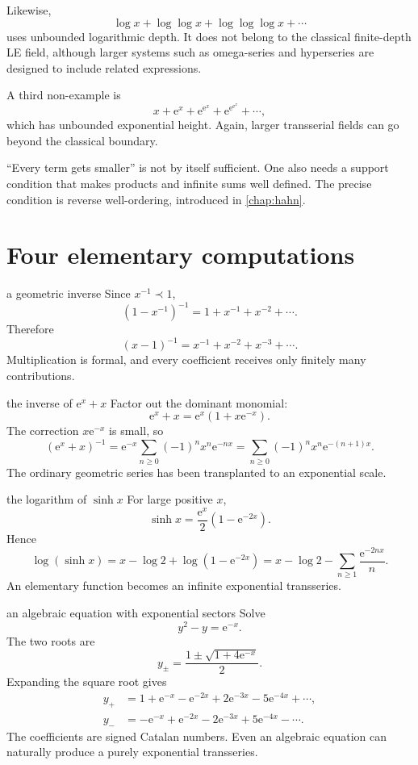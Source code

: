 \documentclass[11pt,openany]{book}
\theoremstyle{plain}
\theoremstyle{definition}
\theoremstyle{remark}
\newcommand{\e}{\mathrm{e}}
\begin{document}
Likewise,
\[
  \log x+\log\log x+\log\log\log x+\cdots
\]
uses unbounded logarithmic depth. It does not belong to the classical finite-depth LE field, although larger systems such as omega-series and hyperseries are designed to include related expressions.

A third non-example is
\[
  x+\e^x+\e^{\e^x}+\e^{\e^{\e^x}}+\cdots,
\]
which has unbounded exponential height. Again, larger transserial fields can go beyond the classical boundary.

\begin{warningbox}
``Every term gets smaller'' is not by itself sufficient. One also needs a support condition that makes products and infinite sums well defined. The precise condition is reverse well-ordering, introduced in \cref{chap:hahn}.
\end{warningbox}

\section{Four elementary computations}

\begin{workedbox}{a geometric inverse}
Since $x^{-1}\prec1$,
\[
  (1-x^{-1})^{-1}=1+x^{-1}+x^{-2}+\cdots.
\]
Therefore
\[
  (x-1)^{-1}=x^{-1}+x^{-2}+x^{-3}+\cdots.
\]
Multiplication is formal, and every coefficient receives only finitely many contributions.
\end{workedbox}

\begin{workedbox}{the inverse of $\e^x+x$}
Factor out the dominant monomial:
\[
  \e^x+x=\e^x(1+x\e^{-x}).
\]
The correction $x\e^{-x}$ is small, so
\[
  (\e^x+x)^{-1}
  =\e^{-x}\sum_{n\ge0}(-1)^n x^n\e^{-nx}
  =\sum_{n\ge0}(-1)^n x^n\e^{-(n+1)x}.
\]
The ordinary geometric series has been transplanted to an exponential scale.
\end{workedbox}

\begin{workedbox}{the logarithm of $\sinh x$}
For large positive $x$,
\[
  \sinh x=\frac{\e^x}{2}(1-\e^{-2x}).
\]
Hence
\[
  \log(\sinh x)
  =x-\log2+\log(1-\e^{-2x})
  =x-\log2-\sum_{n\ge1}\frac{\e^{-2nx}}{n}.
\]
An elementary function becomes an infinite exponential transseries.
\end{workedbox}

\begin{workedbox}{an algebraic equation with exponential sectors}
Solve
\[
  y^2-y=\e^{-x}.
\]
The two roots are
\[
  y_{\pm}=\frac{1\pm\sqrt{1+4\e^{-x}}}{2}.
\]
Expanding the square root gives
\begin{align*}
  y_+&=1+\e^{-x}-\e^{-2x}+2\e^{-3x}-5\e^{-4x}+\cdots,\\
  y_-&=-\e^{-x}+\e^{-2x}-2\e^{-3x}+5\e^{-4x}-\cdots.
\end{align*}
The coefficients are signed Catalan numbers. Even an algebraic equation can naturally produce a purely exponential transseries.
\end{workedbox}
\end{document}
